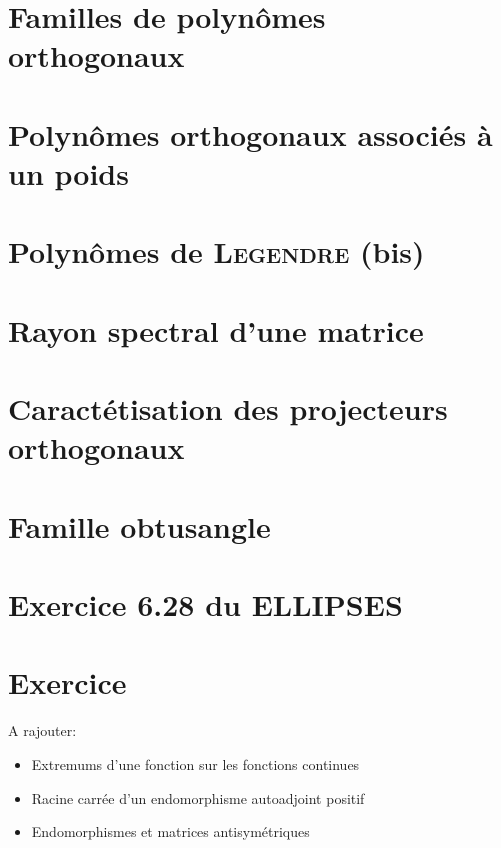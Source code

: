 \section{Familles de polynômes orthogonaux}


\section{Polynômes orthogonaux associés à un poids}


\section{Polynômes de \textsc{Legendre} (bis)}


\section{Rayon spectral d'une matrice} \label{rayon_spectral}


\section{Caractétisation des projecteurs orthogonaux}


\section{Famille obtusangle}


\section{Exercice 6.28 du ELLIPSES}


\section{Exercice}


A rajouter:
\begin{itemize}
    \item Extremums d'une fonction sur les fonctions continues
    \item Racine carrée d'un endomorphisme autoadjoint positif
    \item Endomorphismes et matrices antisymétriques
\end{itemize}